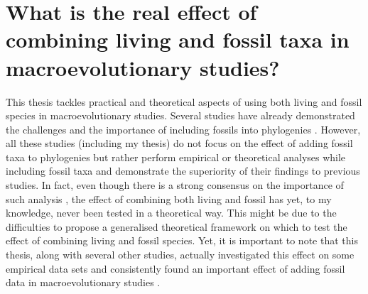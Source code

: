 \section{What is the real effect of combining living and fossil taxa in macroevolutionary studies?} %
This thesis tackles practical and theoretical aspects of using both living and fossil species in macroevolutionary studies.
Several studies have already demonstrated the challenges and the importance of including fossils into phylogenies \citep[e.g.][]{ronquista2012,slaterphylogenetic2013,Wood01032013,beckancient2014,Dembo2015}.
However, all these studies (including my thesis) do not focus on the effect of adding fossil taxa to phylogenies but rather perform empirical or theoretical analyses while including fossil taxa and demonstrate the superiority of their findings to previous studies.
In fact, even though there is a strong consensus on the importance of such analysis \citep{jacksonwhat2006,quentaldiversity2010,dietlconservation2011,slaterunifying2013,fritzdiversity2013,benton2015}, the effect of combining both living and fossil has yet, to my knowledge, never been tested in a theoretical way.
This might be due to the difficulties to propose a generalised theoretical framework on which to test the effect of combining living and fossil species.
Yet, it is important to note that this thesis, along with several other studies, actually investigated this effect on some empirical data sets and consistently found an important effect of adding fossil data in macroevolutionary studies \citep{Finarelli2006,Slateretal2012,slaterphylogenetic2013,SlaterPennel2014,pant2014complex,Mitchell2015}. %

